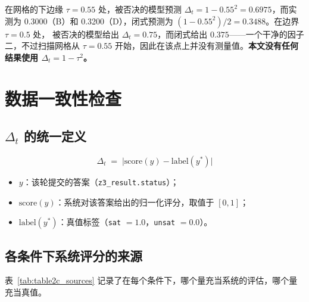 在网格的下边缘 $\tau = 0.55$ 处，被否决的模型预测 $\Delta_t = 1 - 0.55^{2} = 0.6975$，而实测为
0.3000（B）和 0.3200（D），闭式预测为 $(1 - 0.55^{2})/2 = 0.3488$。在边界 $\tau = 0.5$ 处，
被否决的模型给出 $\Delta_t = 0.75$，而闭式给出 $0.375$——一个干净的因子二，不过扫描网格从
$\tau = 0.55$ 开始，因此在该点上并没有测量值。\textbf{本文没有任何结果使用
$\Delta_t = 1-\tau^{2}$。}

\section{数据一致性检查}
\label{app:data_consistency}

\setcounter{table}{0}
\renewcommand{\thetable}{D.\arabic{table}}

\subsection{$\Delta_t$ 的统一定义}

\[
  \Delta_t \;=\; \bigl| \text{score}(y) - \text{label}(y^{*}) \bigr|
\]

\begin{itemize}
  \item $y$：该轮提交的答案（\texttt{z3\_result.status}）；
  \item $\text{score}(y)$：系统对该答案给出的归一化评分，取值于 $[0, 1]$；
  \item $\text{label}(y^{*})$：真值标签（\texttt{sat} $= 1.0$，\texttt{unsat} $= 0.0$）。
\end{itemize}

\subsection{各条件下系统评分的来源}

表~\ref{tab:table2c_sources} 记录了在每个条件下，哪个量充当系统的评估，哪个量充当真值。

